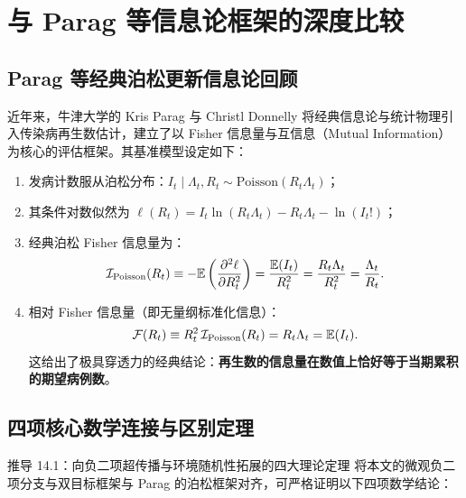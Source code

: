 \section{与 Parag 等信息论框架的深度比较}
\label{sec:part14}

\subsection{Parag 等经典泊松更新信息论回顾}

近年来，牛津大学的 Kris Parag 与 Christl Donnelly \citep{parag2022quantifying, parag2022fundamental} 将经典信息论与统计物理引入传染病再生数估计，建立了以 Fisher 信息量与互信息（Mutual Information）为核心的评估框架。其基准模型设定如下：
\begin{enumerate}
  \item 发病计数服从泊松分布：$I_t \mid \Lambda_t, R_t \sim \text{Poisson}(R_t \Lambda_t)$；
  \item 其条件对数似然为 $\ell(R_t) = I_t \ln(R_t \Lambda_t) - R_t \Lambda_t - \ln(I_t!)$；
  \item 经典泊松 Fisher 信息量为：
  \begin{equation}
    \mathcal{I}_{\text{Poisson}}(R_t) \equiv -\mathbb{E}\left( \frac{\partial^2 \ell}{\partial R_t^2} \right) = \frac{\mathbb{E}(I_t)}{R_t^2} = \frac{R_t \Lambda_t}{R_t^2} = \frac{\Lambda_t}{R_t}.
  \end{equation}
  \item 相对 Fisher 信息量（即无量纲标准化信息）：
  \begin{equation}
    \mathcal{F}(R_t) \equiv R_t^2 \, \mathcal{I}_{\text{Poisson}}(R_t) = R_t \Lambda_t = \mathbb{E}(I_t).
  \end{equation}
  这给出了极具穿透力的经典结论：\textbf{再生数的信息量在数值上恰好等于当期累积的期望病例数}。
\end{enumerate}

\subsection{四项核心数学连接与区别定理}

\begin{theorembox}{推导 14.1：向负二项超传播与环境随机性拓展的四大理论定理}
将本文的微观负二项分支与双目标框架与 Parag 的泊松框架对齐，可严格证明以下四项数学结论：
\end{theorembox}

